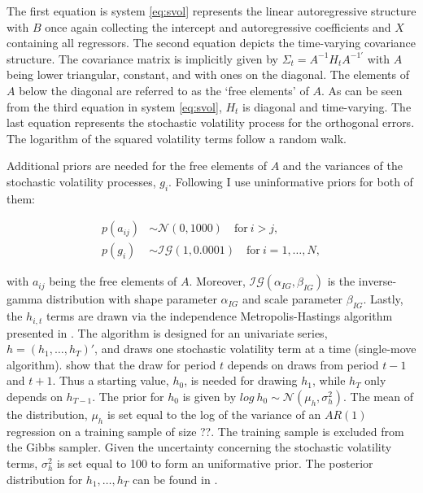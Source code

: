 \documentclass[12pt,letterpaper,fleqn]{article}           %
\begin{document}
The first equation is system \eqref{eq:svol} represents the linear autoregressive structure with $B$ once again collecting the intercept and autoregressive coefficients and $X$ containing all regressors. The second equation depicts the time-varying covariance structure. The covariance matrix is implicitly given by $\Sigma_t = A^{-1}H_tA^{-1'}$ with $A$ being lower triangular, constant, and with ones on the diagonal. The elements of $A$ below the diagonal are referred to as the `free elements' of $A$. As can be seen from the third equation in system \eqref{eq:svol}, $H_t$ is diagonal and time-varying. The last equation represents the stochastic volatility process for the orthogonal errors. The logarithm of the squared volatility terms follow a random walk.

Additional priors are needed for the free elements of $A$ and the variances of the stochastic volatility processes, $g_i$. Following \textcite{alessandri17} I use uninformative priors for both of them:

\begin{align*}
p(a_{ij}) &\sim \mathcal{N}(0, 1000) \quad \mbox{for} \ i > j,\\
p(g_i) &\sim \mathcal{IG}(1, 0.0001) \quad \mbox{for} \ i=1,\ldots,N,
\end{align*}

with $a_{ij}$ being the free elements of $A$. Moreover, $\mathcal{IG}(\alpha_{IG}, \beta_{IG})$ is the inverse-gamma distribution with shape parameter $\alpha_{IG}$ %
and scale parameter $\beta_{IG}$. %
Lastly, the $h_{i,t}$ terms are drawn via the independence Metropolis-Hastings algorithm presented in \textcite{jac94}. The algorithm is designed for an univariate series, $h = (h_1, \ldots, h_T)'$, and draws one stochastic volatility term at a time (single-move algorithm). \textcite{jac94} show that the draw for period $t$ depends on draws from period $t-1$ and $t+1$. Thus a starting value, $h_0$, is needed for drawing $h_1$, while $h_T$ only depends on $h_{T-1}$. The prior for $h_0$ is given by $log\ h_0 \sim \mathcal{N}(\mu_h, \sigma^2_h)$. The mean of the distribution, $\mu_h$ is set equal to the log of the variance of an $AR(1)$ regression on a training sample of size ??. The training sample is excluded from the Gibbs sampler. Given the uncertainty concerning the stochastic volatility terms, $\sigma^2_h$ is set equal to 100 to form an uniformative prior. %
The posterior distribution for $h_1,\ldots,h_T$ can be found in \textcite{jac94}. 
\end{document}
